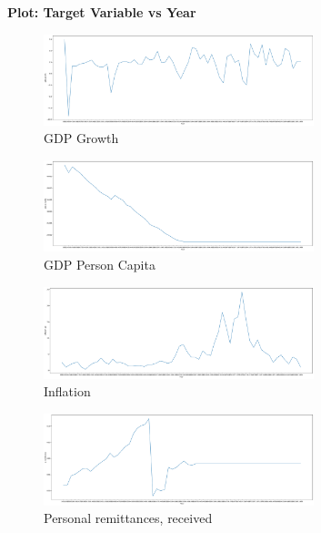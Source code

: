 \textbf{Plot: Target Variable vs Year}\\

\begin{figure}[H]
    \centering
    \includegraphics[width=0.7\textwidth]{Images/gdp-growth vs year (1).pdf}
    \caption{GDP Growth}
    \label{fig1}
\end{figure}


\begin{figure}[H]
    \centering
    \includegraphics[width=0.7\textwidth]{Images/gdp-p-capita vs year (1).pdf}
    \caption{GDP Person Capita}
    \label{fig1}
\end{figure}

\begin{figure}[H]
    \centering
    \includegraphics[width=0.7\textwidth]{Images/inflation-cpi vs year (1).pdf}
    \caption{Inflation}
    \label{fig1}
\end{figure}

\begin{figure}[H]
    \centering
    \includegraphics[width=0.7\textwidth]{Images/p-remittances vs year (1).pdf}
    \caption{Personal remittances, received}
    \label{fig1}
\end{figure}

